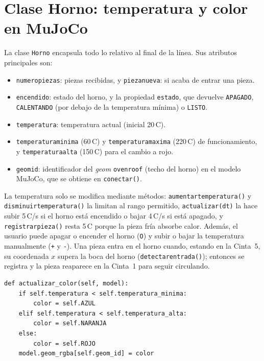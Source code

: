 \documentclass[12pt,a4paper]{article}
\renewcommand{\_}{\guionbajo\allowbreak}
\begin{document}
\clearpage
\section{Clase Horno: temperatura y color en MuJoCo}

La clase \texttt{Horno} encapsula todo lo relativo al final de la línea. Sus atributos
principales son:

\begin{itemize}
    \item \texttt{numero\_piezas}: piezas recibidas, y \texttt{pieza\_nueva}: si acaba de
          entrar una pieza.
    \item \texttt{encendido}: estado del horno, y la propiedad \texttt{estado}, que devuelve
          \texttt{APAGADO}, \texttt{CALENTANDO} (por debajo de la temperatura mínima) o
          \texttt{LISTO}.
    \item \texttt{temperatura}: temperatura actual (inicial 20\,\textdegree C).
    \item \texttt{temperatura\_minima} (60\,\textdegree C) y \texttt{temperatura\_maxima}
          (220\,\textdegree C) de funcionamiento, y \texttt{temperatura\_alta}
          (150\,\textdegree C) para el cambio a rojo.
    \item \texttt{geom\_id}: identificador del \textit{geom} \texttt{oven\_roof} (techo del
          horno) en el modelo MuJoCo, que se obtiene en \texttt{conectar()}.
\end{itemize}

La temperatura solo se modifica mediante métodos:
\texttt{aumentar\_temperatura()} y \texttt{disminuir\_temperatura()} la limitan al rango
permitido, \texttt{actualizar(dt)} la hace subir 5\,\textdegree C/s si el horno está
encendido o bajar 4\,\textdegree C/s si está apagado, y \texttt{registrar\_pieza()} resta
5\,\textdegree C porque la pieza fría absorbe calor. Además, el usuario puede apagar o
encender el horno (\texttt{O}) y subir o bajar la temperatura manualmente (\texttt{+} y
\texttt{-}). Una pieza entra en el horno cuando, estando en la Cinta~5, su coordenada
$x$ supera la boca del horno (\texttt{detectar\_entrada()}); entonces se registra y la
pieza reaparece en la Cinta~1 para seguir circulando.

\begin{lstlisting}[caption={Cambio de color del horno según la temperatura.}]
def actualizar_color(self, model):
    if self.temperatura < self.temperatura_minima:
        color = self.AZUL
    elif self.temperatura < self.temperatura_alta:
        color = self.NARANJA
    else:
        color = self.ROJO
    model.geom_rgba[self.geom_id] = color
\end{lstlisting}
\end{document}
